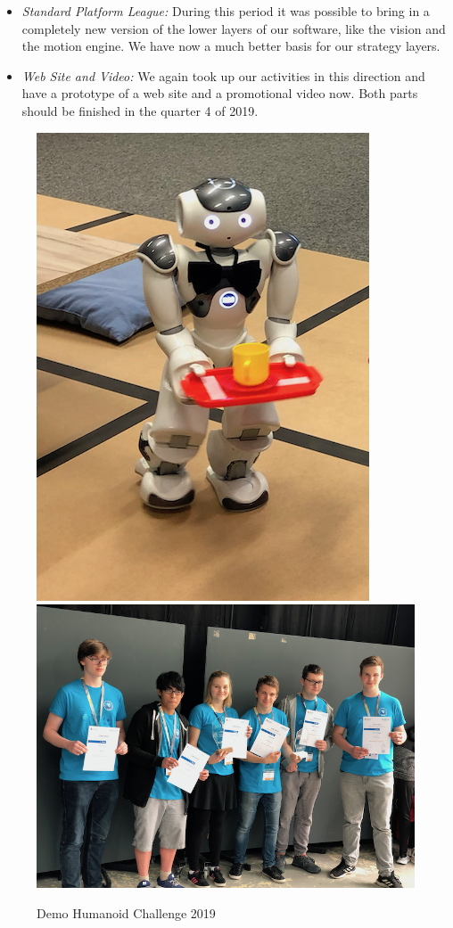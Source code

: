\documentclass[11pt]{article}
\begin{document}
\begin{itemize}
	\item {\em Standard Platform League:} During this period it was possible to bring in a completely new version of the lower layers of our software, like the vision and the motion engine. We have now a much better basis for our strategy layers.
	
	\item {\em Web Site and Video:} We again took up our activities in this direction and have a prototype of a web site and a promotional video now. Both parts should be finished in the quarter 4 of 2019.
\end{itemize}

\begin{figure}
\begin{center}
\includegraphics[scale=0.38]{img/rcjWaiter.png}
\includegraphics[scale=0.38]{img/rcjCeremony.png}
\end{center}
\caption{Demo Humanoid Challenge 2019}
\label{fig:rcjWinners}
\end{figure}
\end{document}
